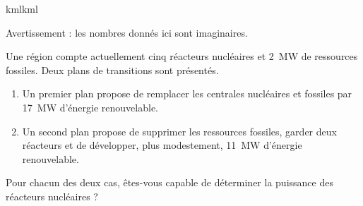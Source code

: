 
kmlkml

Avertissement : les nombres donnés ici sont imaginaires.

Une région compte actuellement cinq réacteurs nucléaires et \SI{2}{\mega\watt} de ressources fossiles. Deux plans de transitions sont présentés.
\begin{enumerate}
    \item
        Un premier plan propose de remplacer les centrales nucléaires et fossiles par \SI{17}{\mega\watt} d'énergie renouvelable.
    \item
        Un second plan propose de supprimer les ressources fossiles, garder deux réacteurs et de développer, plus modestement, \SI{11}{\mega\watt} d'énergie renouvelable.
\end{enumerate}

Pour chacun des deux cas, êtes-vous capable de déterminer la puissance des réacteurs nucléaires ?


